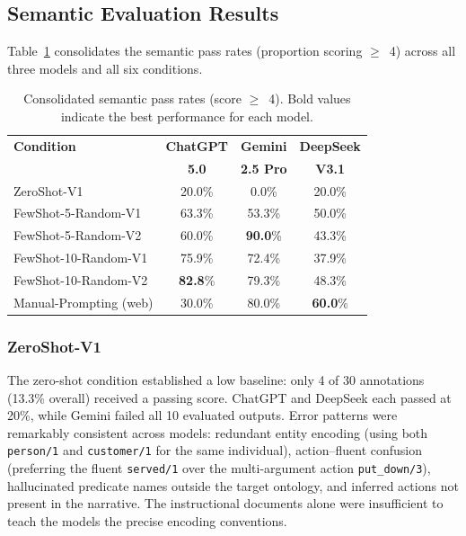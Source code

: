 \documentclass[runningheads]{llncs}
\begin{document}
\subsection{Semantic Evaluation Results}
\label{sec:semantic-results}

Table~\ref{tab:semantic-consolidated} consolidates the semantic pass rates
(proportion scoring $\ge$~4) across all three models and all six conditions.

\begin{table}[t]
\centering
\small
\caption{Consolidated semantic pass rates (score $\ge$~4). Bold values
indicate the best performance for each model.}
\label{tab:semantic-consolidated}
\begin{tabular}{@{}p{4.8cm}ccc@{}}
\toprule
\textbf{Condition}
 & \textbf{ChatGPT} & \textbf{Gemini} & \textbf{DeepSeek} \\
 & \textbf{5.0} & \textbf{2.5 Pro} & \textbf{V3.1} \\
\midrule
ZeroShot-V1            & 20.0\%  &  0.0\%  & 20.0\% \\
FewShot-5-Random-V1    & 63.3\%  & 53.3\%  & 50.0\% \\
FewShot-5-Random-V2    & 60.0\%  & \textbf{90.0}\% & 43.3\% \\
FewShot-10-Random-V1   & 75.9\% & 72.4\%  & 37.9\% \\
FewShot-10-Random-V2   & \textbf{82.8}\% & 79.3\%  & 48.3\% \\
Manual-Prompting (web) & 30.0\%  & 80.0\%  & \textbf{60.0}\% \\
\bottomrule
\end{tabular}
\end{table}



\subsubsection{ZeroShot-V1}

The zero-shot condition established a low baseline: only 4 of 30 annotations
(13.3\% overall) received a passing score.  ChatGPT and DeepSeek each passed
at 20\%, while Gemini failed all 10 evaluated outputs.  Error patterns were
remarkably consistent across models: redundant entity encoding (using both
\texttt{person/1} and \texttt{customer/1} for the same individual),
action--fluent confusion (preferring the fluent \texttt{served/1} over the
multi-argument action \texttt{put\_down/3}), hallucinated predicate names
outside the target ontology, and inferred actions not present in the
narrative.  The instructional documents alone were insufficient to teach the
models the precise encoding conventions.
\end{document}
